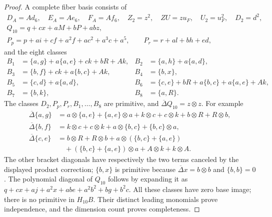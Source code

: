 \begin{proof}
A complete fiber basis consists of
\[
\begin{gathered}
 D_A=Ad_6,\quad E_A=Ae_6,\quad F_A=Af_6,
 \quad Z_2=z^2,\quad ZU=zu_F,\quad U_2=u_F^2,
 \quad D_2=d^2,\\
 Q_{10}=q+cx+aM+bP+abz,\\
 P_p=p+ai+cf+a^2f+ac^2+a^3c+a^5,
 \qquad P_r=r+al+bh+ed,
\end{gathered}
\tag{D.2.22a4}
\]
and the eight classes
\[
\begin{aligned}
 B_1&=\{a,g\}+a\{a,e\}+ck+bR+Ak,&
 B_2&=\{a,h\}+a\{a,d\},\\
 B_3&=\{b,f\}+ck+a\{b,c\}+Ak,&
 B_4&=\{b,x\},\\
 B_5&=\{c,d\}+a\{a,d\},&
 B_6&=\{c,e\}+bR+a\{b,c\}+a\{a,e\}+Ak,\\
 B_7&=\{b,k\},&B_8&=\{a,R\}.
\end{aligned}
\tag{D.2.22a5}
\]
The classes $D_2,P_p,P_r,B_1,\ldots,B_8$ are primitive,
and $\overline\Delta Q_{10}=z\otimes z$.
For example
\[
\begin{aligned}
 \overline\Delta\{a,g\}
 &=a\otimes\{a,e\}+\{a,e\}\otimes a
   +k\otimes c+c\otimes k+b\otimes R+R\otimes b,\\
 \overline\Delta\{b,f\}
 &=k\otimes c+c\otimes k
   +a\otimes\{b,c\}+\{b,c\}\otimes a,\\
 \overline\Delta\{c,e\}
 &=b\otimes R+R\otimes b
   +a\otimes(\{b,c\}+\{a,e\})\\
 &\quad +(\{b,c\}+\{a,e\})\otimes a
   +A\otimes k+k\otimes A.
\end{aligned}
\]
The other bracket diagonals have respectively the two terms canceled
by the displayed product correction; $\{b,x\}$ is primitive because
$\overline\Delta x=b\otimes b$ and $\{b,b\}=0$.
The polynomial diagonal of $Q_{10}$ follows by expanding it as
$q+cx+aj+a^2x+abe+a^2b^2+bg+b^2c$.
All these classes have zero base image; there is no primitive in
$H_{10}B$. Their distinct leading monomials prove independence,
and the dimension count proves completeness.


\end{proof}
